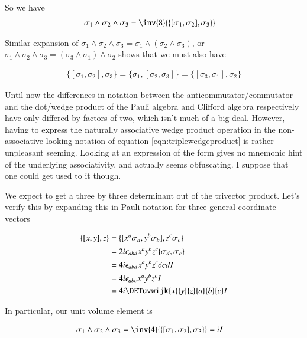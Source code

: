 \documentclass{article}
\newcommand{\symmetric}[2]{{\{{#1},{#2}\}}}
\newcommand{\antisymmetric}[2]{[{#1},{#2}]}
\begin{document}
So we have
\begin{align}\label{eqn:triplewedgeproduct}
\sigma_1 \wedge \sigma_2 \wedge \sigma_3 
&= \inv{8} \symmetric{\antisymmetric{\sigma_1}{\sigma_2}}{\sigma_3}
\end{align}

Similar expansion of $\sigma_1 \wedge \sigma_2 \wedge \sigma_3 = \sigma_1 \wedge (\sigma_2 \wedge \sigma_3)$, or
$\sigma_1 \wedge \sigma_2 \wedge \sigma_3 = (\sigma_3 \wedge \sigma_1) \wedge \sigma_2$
 shows that we must also have

\begin{align}
\symmetric{\antisymmetric{\sigma_1}{\sigma_2}}{\sigma_3}
= \symmetric{\sigma_1}{\antisymmetric{\sigma_2}{\sigma_3}}
= \symmetric{\antisymmetric{\sigma_3}{\sigma_1}}{\sigma_2}
\end{align}

Until now the differences in notation between the anticommutator/commutator and the dot/wedge product of the Pauli algebra and Clifford algebra respectively have only differed by factors of two, which isn't much of a big deal.  However, having to express the naturally associative wedge product operation in the non-associative looking notation of equation \ref{eqn:triplewedgeproduct} is rather unpleasant seeming.  Looking at an expression of the form gives no mnemonic
hint of the underlying associativity, and actually seems obfuscating.  I suppose that one could get used to it though.

We expect to get a three by three determinant out of the trivector product.
Let's verify this by expanding this in Pauli notation for three general coordinate vectors

\begin{align*}
\symmetric{\antisymmetric{x}{y}}{z} 
&= \symmetric{\antisymmetric{x^a \sigma_a}{y^b \sigma_b}}{ z^c \sigma_c} \\
&= 2 i \epsilon_{a b d} x^a y^b z^c \symmetric{\sigma_d}{\sigma_c} \\
&= 4 i \epsilon_{a b d} x^a y^b z^c \delta{c d} I \\
&= 4 i \epsilon_{a b c} x^a y^b z^c I \\
&= 4 i \DETuvwijk{x}{y}{z}{a}{b}{c} I
\end{align*}

In particular, our unit volume element is 

\begin{align}
\sigma_1 \wedge \sigma_2 \wedge \sigma_3 
&= \inv{4} \symmetric{\antisymmetric{\sigma_1}{\sigma_2}}{\sigma_3} = i I
\end{align}
\end{document}
